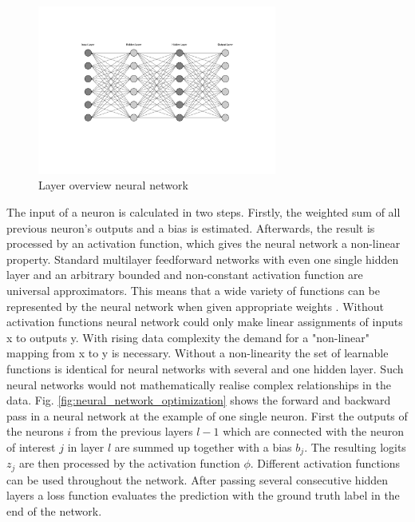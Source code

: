 \begin{figure}[H]
  \centering
  \includegraphics[width=0.7\textwidth]{neural_network_overview.pdf}
  \caption {Layer overview neural network}
  \label{fig:neural_network_overview}
\end{figure}
The input of a neuron is calculated in two steps. Firstly, the weighted sum of all previous neuron's outputs and a bias is estimated. Afterwards, the result is processed by an activation function, which gives the neural network a non-linear property. Standard multilayer feedforward networks with even one single hidden layer and an arbitrary bounded and non-constant activation function are universal approximators. This means that a wide variety of functions can be represented by the neural network when given appropriate weights \cite{HORNIK1991}. Without activation functions neural network could only make linear assignments of inputs x to outputs y. With rising data complexity the demand for a "non-linear" mapping from x to y is necessary. Without a non-linearity the set of learnable functions is identical for neural networks with several and one hidden layer. Such neural networks would not mathematically realise complex relationships in the data. Fig. \ref{fig:neural_network_optimization} shows the forward and backward pass in a neural network at the example of one single neuron. First the outputs of the neurons $i$ from the previous layers $l-1$ which are connected with the neuron of interest $j$ in layer $l$ are summed up together with a bias $b_{j}$. The resulting logits $z_{j}$ are then processed by the activation function $\phi$. Different activation functions can be used throughout the network. After passing several consecutive hidden layers a loss function evaluates the prediction with the ground truth label in the end of the network.


